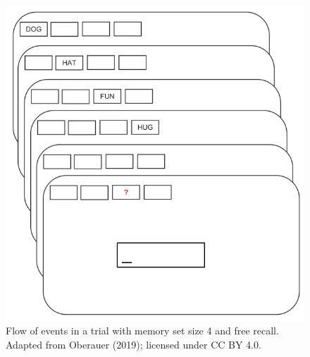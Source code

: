 \documentclass[12pt,ignorenonframetext,aspectratio=169]{beamer}
\begin{document}
\begin{frame}



\small

\begin{figure}
\includegraphics[width=8.89in]{cc_figure/fig1_oberauer_2019_modified} \caption{Flow of events in a trial with memory set size 4 and free recall. Adapted from Oberauer (2019); licensed under CC BY 4.0.}\label{fig:oberauer}
\end{figure}

\normalsize

\end{frame}
\end{document}
